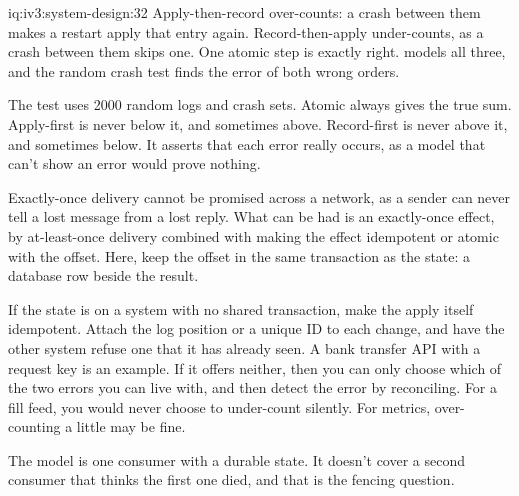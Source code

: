 \begin{solution}{iq:iv3:system-design:32}
Apply-then-record over-counts: a crash between them makes a restart apply that entry again. Record-then-apply under-counts, as a crash between them skips one. One atomic step is exactly right.  models all three, and the random crash test finds the error of both wrong orders.
\label{lst:iv3:sd:consumer}

The test uses 2000 random logs and crash sets. Atomic always gives the true sum. Apply-first is never below it, and sometimes above. Record-first is never above it, and sometimes below. It asserts that each error really occurs, as a model that can't show an error would prove nothing.

Exactly-once delivery cannot be promised across a network, as a sender can never tell a lost message from a lost reply. What can be had is an exactly-once effect, by at-least-once delivery combined with making the effect idempotent or atomic with the offset. Here, keep the offset in the same transaction as the state: a database row beside the result.

If the state is on a system with no shared transaction, make the apply itself idempotent. Attach the log position or a unique ID to each change, and have the other system refuse one that it has already seen. A bank transfer API with a request key is an example. If it offers neither, then you can only choose which of the two errors you can live with, and then detect the error by reconciling. For a fill feed, you would never choose to under-count silently. For metrics, over-counting a little may be fine.

The model is one consumer with a durable state. It doesn't cover a second consumer that thinks the first one died, and that is the fencing question.

\end{solution}

